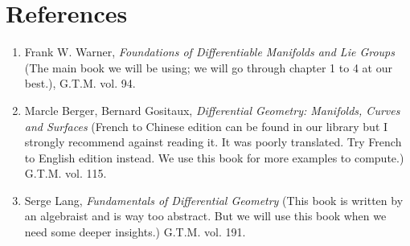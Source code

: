 \documentclass[twoside]{article}
\begin{document}
	\section{References}
		\begin{enumerate}
			\item Frank W. Warner, \textit{Foundations of Differentiable Manifolds and Lie Groups} (The main book we will be using; we will go through chapter 1 to 4 at our best.), G.T.M. vol. 94.
			\item Marcle Berger, Bernard Gositaux, \textit{Differential Geometry: Manifolds, Curves and Surfaces} (French to Chinese edition can be found in our library but I strongly recommend against reading it. It was poorly translated. Try French to English edition instead. We use this book for more examples to compute.) G.T.M. vol. 115.
			\item Serge Lang, \textit{Fundamentals of Differential Geometry} (This book is written by an algebraist and is way too abstract. But we will use this book when we need some deeper insights.) G.T.M. vol. 191.
		\end{enumerate}
\end{document}
